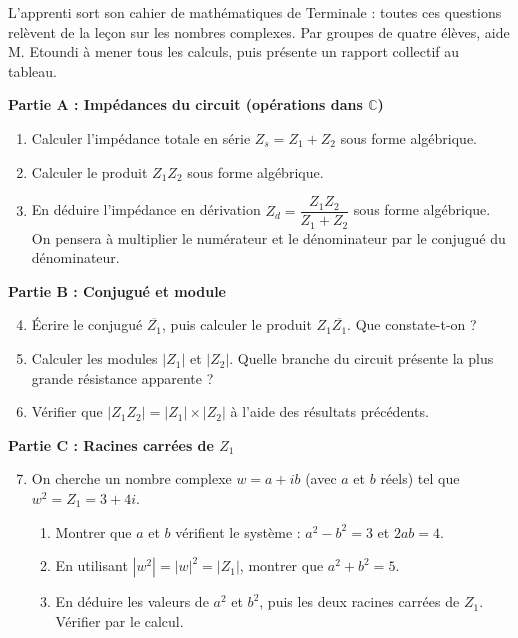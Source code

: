 \documentclass[11pt]{article}
\newcounter{popsec}
\newcounter{popsub}
\newcommand{\courssub}[1]{%
  \stepcounter{popsub}%
  \par\vspace{9pt}\noindent{\popxbold\fontsize{11.5}{13}\selectfont\color{popink}{\color{poporange}\thepopsec.\thepopsub}\hspace{6pt}#1}\par\nopagebreak\vspace{4pt}
}
\begin{document}
L'apprenti sort son cahier de mathématiques de Terminale : toutes ces questions relèvent de la leçon sur les nombres complexes. Par groupes de quatre élèves, aide M. Etoundi à mener tous les calculs, puis présente un rapport collectif au tableau.

\courssub{Consignes}

\textbf{Partie A : Impédances du circuit (opérations dans $\mathbb{C}$)}
\begin{enumerate}
\item Calculer l'impédance totale en série $Z_s = Z_1 + Z_2$ sous forme algébrique.
\item Calculer le produit $Z_1 Z_2$ sous forme algébrique.
\item En déduire l'impédance en dérivation $Z_d = \dfrac{Z_1 Z_2}{Z_1 + Z_2}$ sous forme algébrique. On pensera à multiplier le numérateur et le dénominateur par le conjugué du dénominateur.
\end{enumerate}

\textbf{Partie B : Conjugué et module}
\begin{enumerate}
\setcounter{enumi}{3}
\item Écrire le conjugué $\overline{Z_1}$, puis calculer le produit $Z_1 \overline{Z_1}$. Que constate-t-on ?
\item Calculer les modules $|Z_1|$ et $|Z_2|$. Quelle branche du circuit présente la plus grande \og résistance apparente \fg{} ?
\item Vérifier que $|Z_1 Z_2| = |Z_1| \times |Z_2|$ à l'aide des résultats précédents.
\end{enumerate}

\textbf{Partie C : Racines carrées de $Z_1$}
\begin{enumerate}
\setcounter{enumi}{6}
\item On cherche un nombre complexe $w = a + ib$ (avec $a$ et $b$ réels) tel que $w^2 = Z_1 = 3 + 4i$.
\begin{enumerate}
\item Montrer que $a$ et $b$ vérifient le système : $a^2 - b^2 = 3$ et $2ab = 4$.
\item En utilisant $|w^2| = |w|^2 = |Z_1|$, montrer que $a^2 + b^2 = 5$.
\item En déduire les valeurs de $a^2$ et $b^2$, puis les deux racines carrées de $Z_1$. Vérifier par le calcul.
\end{enumerate}
\end{enumerate}
\end{document}
